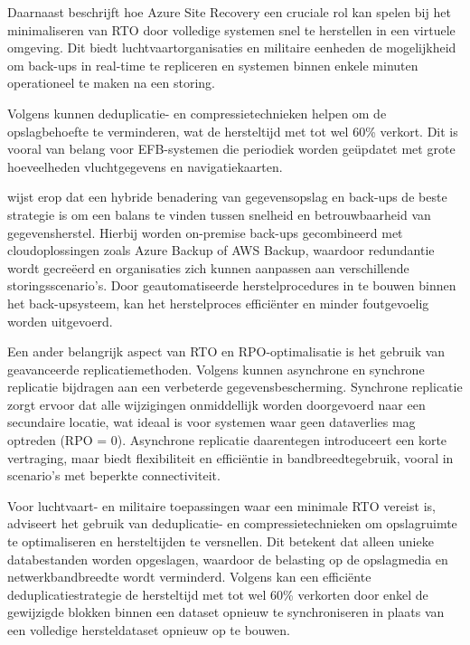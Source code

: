 Daarnaast beschrijft \textcite{MicrosoftBackup} hoe Azure Site Recovery een cruciale rol kan spelen bij het minimaliseren van RTO door volledige systemen snel te herstellen in een virtuele omgeving. Dit biedt luchtvaartorganisaties en militaire eenheden de mogelijkheid om back-ups in real-time te repliceren en systemen binnen enkele minuten operationeel te maken na een storing.

Volgens \textcite{AWSBackup} kunnen deduplicatie- en compressietechnieken helpen om de opslagbehoefte te verminderen, wat de hersteltijd met tot wel 60\% verkort. Dit is vooral van belang voor EFB-systemen die periodiek worden geüpdatet met grote hoeveelheden vluchtgegevens en navigatiekaarten.

\textcite{Yanamala2024} wijst erop dat een hybride benadering van gegevensopslag en back-ups de beste strategie is om een balans te vinden tussen snelheid en betrouwbaarheid van gegevensherstel. Hierbij worden on-premise back-ups gecombineerd met cloudoplossingen zoals Azure Backup of AWS Backup, waardoor redundantie wordt gecreëerd en organisaties zich kunnen aanpassen aan verschillende storingsscenario’s. Door geautomatiseerde herstelprocedures in te bouwen binnen het back-upsysteem, kan het herstelproces efficiënter en minder foutgevoelig worden uitgevoerd.

Een ander belangrijk aspect van RTO en RPO-optimalisatie is het gebruik van geavanceerde replicatiemethoden. Volgens \textcite{VeeamRTO} kunnen asynchrone en synchrone replicatie bijdragen aan een verbeterde gegevensbescherming. Synchrone replicatie zorgt ervoor dat alle wijzigingen onmiddellijk worden doorgevoerd naar een secundaire locatie, wat ideaal is voor systemen waar geen dataverlies mag optreden (RPO = 0). Asynchrone replicatie daarentegen introduceert een korte vertraging, maar biedt flexibiliteit en efficiëntie in bandbreedtegebruik, vooral in scenario’s met beperkte connectiviteit.

Voor luchtvaart- en militaire toepassingen waar een minimale RTO vereist is, adviseert \textcite{FAA_AC91-78A} het gebruik van deduplicatie- en compressietechnieken om opslagruimte te optimaliseren en hersteltijden te versnellen. Dit betekent dat alleen unieke databestanden worden opgeslagen, waardoor de belasting op de opslagmedia en netwerkbandbreedte wordt verminderd. Volgens \textcite{AWSBackup} kan een efficiënte deduplicatiestrategie de hersteltijd met tot wel 60\% verkorten door enkel de gewijzigde blokken binnen een dataset opnieuw te synchroniseren in plaats van een volledige hersteldataset opnieuw op te bouwen.

